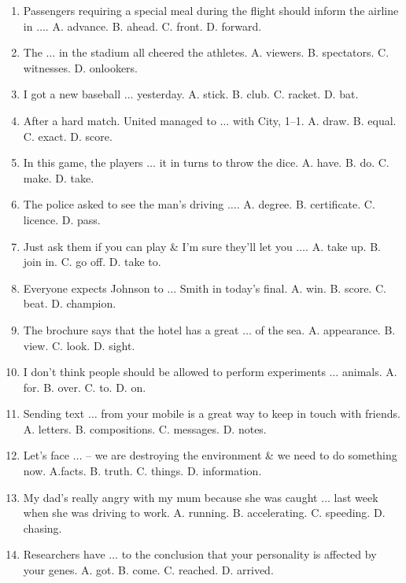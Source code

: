 \documentclass{article}
\numberwithin{equation}{section}
\begin{document}
\begin{enumerate}[leftmargin=8mm]
	\item Passengers requiring a special meal during the flight should inform the airline in $\ldots$. {\sf A.} advance. {\sf B.} ahead. {\sf C.} front. {\sf D.} forward.
	\item The $\ldots$ in the stadium all cheered the athletes. {\sf A.} viewers. {\sf B.} spectators. {\sf C.} witnesses. {\sf D.} onlookers.
	\item I got a new baseball $\ldots$ yesterday. {\sf A.} stick. {\sf B.} club. {\sf C.} racket. {\sf D.} bat.
	\item After a hard match. United managed to $\ldots$ with City, 1--1. {\sf A.} draw. {\sf B.} equal. {\sf C.} exact. {\sf D.} score.
	\item In this game, the players $\ldots$ it in turns to throw the dice. {\sf A.} have. {\sf B.} do. {\sf C.} make. {\sf D.} take.
	\item The police asked to see the man's driving $\ldots$. {\sf A.} degree. {\sf B.} certificate. {\sf C.} licence. {\sf D.} pass.
	\item Just ask them if you can play \& I'm sure they'll let you $\ldots$. {\sf A.} take up. {\sf B.} join in. {\sf C.} go off. {\sf D.} take to.
	\item Everyone expects Johnson to $\ldots$ Smith in today's final. {\sf A.} win. {\sf B.} score. {\sf C.} beat. {\sf D.} champion.
	\item The brochure says that the hotel has a great $\ldots$ of the sea. {\sf A.} appearance. {\sf B.} view. {\sf C.} look. {\sf D.} sight.
	\item I don't think people should be allowed to perform experiments $\ldots$ animals. {\sf A.} for. {\sf B.} over. {\sf C.} to. {\sf D.} on.
	\item Sending text $\ldots$ from your mobile is a great way to keep in touch with friends. {\sf A.} letters. {\sf B.} compositions. {\sf C.} messages. {\sf D.} notes.
	\item Let's face $\ldots$ -- we are destroying the environment \& we need to do something now. A.facts. {\sf B.} truth. {\sf C.} things. {\sf D.} information.
	\item My dad's really angry with my mum because she was caught $\ldots$ last week when she was driving to work. {\sf A.} running. {\sf B.} accelerating. {\sf C.} speeding. {\sf D.} chasing.
	\item Researchers have $\ldots$ to the conclusion that your personality is affected by your genes. {\sf A.} got. {\sf B.} come. {\sf C.} reached. {\sf D.} arrived.

\end{enumerate}
\end{document}
